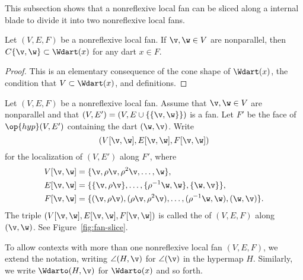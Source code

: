 This subsection shows that a nonreflexive local fan can be sliced
along a internal blade to divide it into two nonreflexive local fans.

\begin{lemma}[]
Let $(V,E,F)$ be a nonreflexive local fan.
If $\v,\w\in V$ are nonparallel, then $C\{\v,\w\} \subset
\Wdart(x)$ for any dart $x\in F$.
\end{lemma}
%

\begin{proof} This is an elementary consequence of
the cone shape of $\Wdart(x)$,  the condition that $V\subset
\Wdart(x)$, and definitions.
\end{proof}






\begin{definition}[slice]
 Let $(V,E,F)$ be a nonreflexive local fan.  Assume that
$\v,\w\in V$ are nonparallel and that $(V,E')=(V,E\cup
\{\{\v,\w\}\})$ is a fan.  Let $F'$ be the face of $\op{hyp}(V,E')$
containing the dart $(\w,\v)$.  Write
\[ (V[\v,\w],E[\v,\w],F[\v,\w])\] 
for the localization of $(V,E')$ along $F'$, where
\begin{align*}
  V[\v,\w] &= \{\v,\rho \v,\rho^2 \v,\ldots,\w\},\\
  E[\v,\w] &= \{\{\v,\rho \v\},\ldots,\{\rho^{-1}\w,\w\},\{\w,\v\}\},\\
  F[\v,\w] &= \{(\v,\rho \v),(\rho \v,\rho^2 \v),
 \ldots,(\rho^{-1}\w,\w),(\w,\v)\}.
\end{align*}
The triple $(V[\v,\w],E[\v,\w],F[\v,\w])$ is called the
 of $(V,E,F)$ along $(\v,\w)$.
See Figure~\ref{fig:fan-slice}.
\end{definition}
%
%

\figSXYGYPC %

To allow contexts with more than one nonreflexive local fan $(V,E,F)$, we  extend
the notation, writing $\angle(H,\v)$ for $\angle(\v)$ in the hypermap
$H$.  Similarly, we write $\Wdarto(H,\v)$ for $\Wdarto(x)$ and so
forth.  %
%
%



